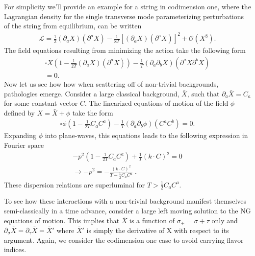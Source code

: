 \documentclass[%
 reprint,
 amsmath,amssymb,
 aps,
]{revtex4-1}
\begin{document}
For simplicity we'll provide an example for a string in codimension one, where the Lagrangian
density for the single transverse mode parameterizing perturbations of the string from equilibrium, can be written
\begin{eqnarray}
    \mathcal{L} = \frac{1}{2} (\partial_{a} X)(\partial^{a} X) -
    \frac{1}{8 T}[(\partial_{a} X)(\partial^{a} X)]^2 + \mathcal{O}(X^8) \nonumber .
\end{eqnarray}
The field equations resulting from minimizing the action take the following form
\begin{eqnarray}
    \square X \left( 1- \frac{1}{2 T} (\partial_a X) (\partial^a X) \right) - \frac{1}{T} (\partial_a \partial_b X)
    (\partial^a X \partial^b X) \nonumber \\
    = 0. \nonumber
\end{eqnarray}
Now let us see how how when scattering off of non-trivial backgrounds, pathologies emerge.  Consider a large classical background,
$\bar{X}$, such that $\partial_a \bar{X} = C_a$ for some constant vector $C$.  The linearized
equations of motion of the field $\phi$ defined by $X = \bar{X} + \phi$ take the form
\begin{eqnarray}
    \square \phi \left( 1 - \frac{1}{2 T} C_a C^a \right) - \frac{1}{T} (\partial_a \partial_b \phi)
    (C^a C^b) = 0. \nonumber
\end{eqnarray}
Expanding $\phi$ into plane-waves, this equations leads to the following expression in Fourier space
\begin{eqnarray}
    -p^2 \left( 1 - \frac{1}{2 T} C_a C^a \right) + \frac{1}{T} (k \cdot C)^2 = 0 \nonumber \\
        \rightarrow -p^2 = - \frac{(k \cdot C)^2}{T - \frac{1}{2} C_a C^a} \; .  \nonumber
\end{eqnarray}
These dispersion relations are superluminal for $T > \frac{1}{2} C_a C^a$.

To see how these interactions with a non-trivial background manifest themselves semi-classically in
a time advance, consider a large left moving solution to the NG equations of motion. This implies
that $\bar{X}$ is a function of $\sigma_+ = \sigma + \tau$ only and $\partial_{\sigma} \bar{X} =
\partial_{\tau} \bar{X} = \bar{X}'$ where $\bar{X}'$ is simply the derivative of X with respect to its argument.
Again, we consider the codimension one case to avoid carrying flavor indices.
\end{document}
